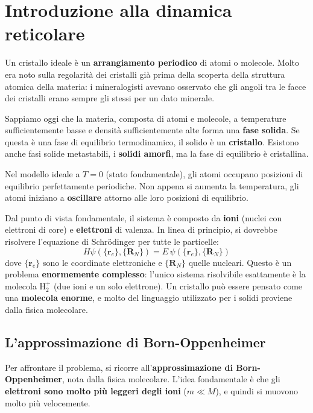 \newpage
\section{Introduzione alla dinamica reticolare}


Un cristallo ideale è un \textbf{arrangiamento periodico} di atomi o molecole. Molto era noto sulla regolarità dei cristalli già prima della scoperta della struttura atomica della materia: i mineralogisti avevano osservato che gli angoli tra le facce dei cristalli erano sempre gli stessi per un dato minerale.

Sappiamo oggi che la materia, composta di atomi e molecole, a temperature sufficientemente basse e densità sufficientemente alte forma una \textbf{fase solida}. Se questa è una fase di equilibrio termodinamico, il solido è un \textbf{cristallo}. Esistono anche fasi solide metastabili, i \textbf{solidi amorfi}, ma la fase di equilibrio è cristallina.

Nel modello ideale a $T = 0$ (stato fondamentale), gli atomi occupano posizioni di equilibrio perfettamente periodiche. Non appena si aumenta la temperatura, gli atomi iniziano a \textbf{oscillare} attorno alle loro posizioni di equilibrio.



Dal punto di vista fondamentale, il sistema è composto da \textbf{ioni} (nuclei con elettroni di core) e \textbf{elettroni} di valenza. In linea di principio, si dovrebbe risolvere l'equazione di Schrödinger per tutte le particelle:
\begin{equation}
H\psi(\{\mathbf{r}_e\}, \{\mathbf{R}_N\}) = E\,\psi(\{\mathbf{r}_e\}, \{\mathbf{R}_N\})
\end{equation}
dove $\{\mathbf{r}_e\}$ sono le coordinate elettroniche e $\{\mathbf{R}_N\}$ quelle nucleari. Questo è un problema \textbf{enormemente complesso}: l'unico sistema risolvibile esattamente è la molecola $\text{H}_2^+$ (due ioni e un solo elettrone). Un cristallo può essere pensato come una \textbf{molecola enorme}, e molto del linguaggio utilizzato per i solidi proviene dalla fisica molecolare.

\subsection{L'approssimazione di Born-Oppenheimer}

Per affrontare il problema, si ricorre all'\textbf{approssimazione di Born-Oppenheimer}, nota dalla fisica molecolare. L'idea fondamentale è che gli \textbf{elettroni sono molto più leggeri degli ioni} ($m \ll M$), e quindi si muovono molto più velocemente.

